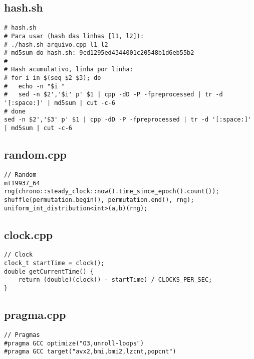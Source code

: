 \documentclass[11pt, a4paper, twoside]{article}
\begin{document}
\subsection{hash.sh}
\begin{lstlisting}
# hash.sh
# Para usar (hash das linhas [l1, l2]):
# ./hash.sh arquivo.cpp l1 l2
# md5sum do hash.sh: 9cd1295ed4344001c20548b1d6eb55b2
#
# Hash acumulativo, linha por linha:
# for i in $(seq $2 $3); do
#   echo -n "$i "
#   sed -n $2','$i' p' $1 | cpp -dD -P -fpreprocessed | tr -d '[:space:]' | md5sum | cut -c-6
# done
sed -n $2','$3' p' $1 | cpp -dD -P -fpreprocessed | tr -d '[:space:]' | md5sum | cut -c-6
\end{lstlisting}

\subsection{random.cpp}
\begin{lstlisting}
// Random
mt19937_64 rng(chrono::steady_clock::now().time_since_epoch().count());
shuffle(permutation.begin(), permutation.end(), rng);
uniform_int_distribution<int>(a,b)(rng);
\end{lstlisting}

\subsection{clock.cpp}
\begin{lstlisting}
// Clock
clock_t startTime = clock();
double getCurrentTime() {
	return (double)(clock() - startTime) / CLOCKS_PER_SEC;
}
\end{lstlisting}

\subsection{pragma.cpp}
\begin{lstlisting}
// Pragmas
#pragma GCC optimize("O3,unroll-loops")
#pragma GCC target("avx2,bmi,bmi2,lzcnt,popcnt")
\end{lstlisting}
\end{document}
